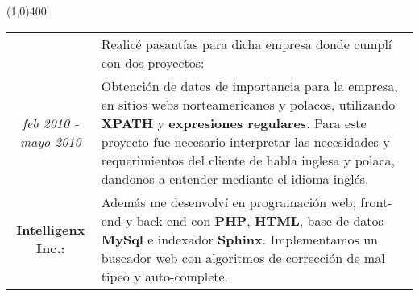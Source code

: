 \begin{center}
\line(1,0){400}
\end{center}
\noindent
\begin{tabular}{c|p{12.5cm}}
& \large Realicé pasantías para dicha empresa donde cumplí con dos proyectos:\\
\large\textit{feb 2010 - mayo 2010} & \large Obtención de datos de importancia para la empresa, en sitios webs norteamericanos y polacos, utilizando \textbf{XPATH} y \textbf{expresiones regulares}. Para este proyecto fue necesario interpretar las necesidades y requerimientos del cliente de habla inglesa y polaca, dandonos a entender mediante el idioma inglés.\\
\large\textbf{Intelligenx Inc.:} & \large Además me desenvolví en programación web, front-end y back-end con \textbf{PHP}, \textbf{HTML}, base de datos \textbf{MySql} e indexador \textbf{Sphinx}. Implementamos un buscador web con algoritmos de corrección de mal tipeo y auto-complete. 
\end{tabular}

